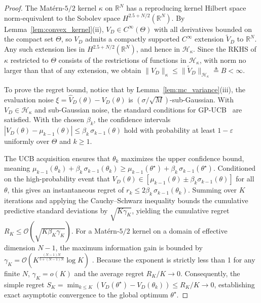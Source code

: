 \documentclass[12pt]{article}
\renewcommand{\[}{\left[}
\renewcommand{\]}{\right]}
\renewcommand{\(}{\left(}
\renewcommand{\)}{\right)}
\newcounter{l1}
\newcounter{l2}
\newcounter{l3}
\begin{document}
\begin{proof}
The Mat\'{e}rn-$5/2$ kernel $\kappa$ on $\mathbb{R}^N$ has a reproducing kernel Hilbert
space norm-equivalent to the Sobolev space $H^{2.5+N/2}(\mathbb{R}^N)$. By
Lemma~\ref{lem:convex_kernel}(ii), $V_D \in C^\infty(\Theta)$ with all derivatives
bounded on the compact set $\Theta$, so $V_D$ admits a compactly supported $C^\infty$
extension $\widetilde{V}_D$ to $\mathbb{R}^N$. Any such extension lies in
$H^{2.5+N/2}(\mathbb{R}^N)$, and hence in $\mathcal{H}_\kappa$. Since the RKHS of
$\kappa$ restricted to $\Theta$ consists of the restrictions of functions in
$\mathcal{H}_\kappa$, with norm no larger than that of any extension, we obtain
$\|V_D\|_\kappa \le \|\widetilde{V}_D\|_{\mathcal{H}_\kappa} \triangleq B < \infty$.

To prove the regret bound, notice that by Lemma~\ref{lem:mc_variance}(iii), the evaluation noise
$\xi = \widehat{V}_D(\theta) - V_D(\theta)$ is $(\sigma/\sqrt{M})$-sub-Gaussian.
With $V_D \in \mathcal{H}_\kappa$ and sub-Gaussian noise, the standard conditions for
GP-UCB~\cite{srinivas2009gaussian} are satisfied. With the chosen $\beta_k$, the
confidence intervals
$|V_D(\theta) - \mu_{k-1}(\theta)| \le \beta_k\,\sigma_{k-1}(\theta)$ hold with
probability at least $1-\varepsilon$ uniformly over $\Theta$ and $k \ge 1$.

The UCB acquisition ensures that $\theta_k$ maximizes the upper confidence bound, meaning
$\mu_{k-1}(\theta_k) + \beta_k\,\sigma_{k-1}(\theta_k) \ge \mu_{k-1}(\theta^\star) + \beta_k\,\sigma_{k-1}(\theta^\star)$. 
Conditioned on the high-probability event that $V_D(\theta) \in [\mu_{k-1}(\theta) \pm \beta_k\sigma_{k-1}(\theta)]$ for all $\theta$, this gives an instantaneous regret of $r_k \le 2\beta_k\,\sigma_{k-1}(\theta_k)$.
Summing over $K$ iterations and applying the Cauchy--Schwarz inequality bounds the cumulative
predictive standard deviations by $\sqrt{K\gamma_K}$, yielding the cumulative regret
$R_K \le \mathcal{O}(\sqrt{K\beta_K\gamma_K})$.
For a Mat\'{e}rn-$5/2$ kernel on a domain of effective dimension $N-1$, the maximum information gain is bounded by $\gamma_K = \mathcal{O}\left(K^{\frac{(N-1)N}{5 + (N-1)N}} \log K\right)$
\cite{srinivas2009gaussian}. Because the exponent is strictly less than 1 for any finite $N$, $\gamma_K = o(K)$ and the average regret $R_K/K \to 0$.
Consequently, the simple regret
$S_K = \min_{k\le K}(V_D(\theta^\star) - V_D(\theta_k)) \le R_K/K \to 0$,
establishing exact asymptotic convergence to the global optimum $\theta^\star$.
\end{proof}
\end{document}
